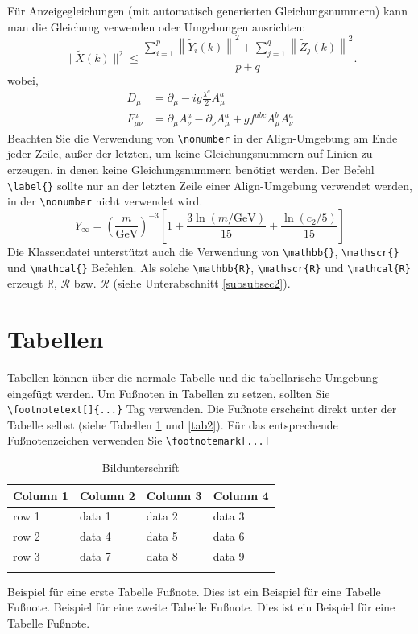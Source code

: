 \documentclass[pdflatex,sn-mathphys-num]{sn-jnl}%
\theoremstyle{thmstyleone}%
\theoremstyle{thmstyletwo}%
\theoremstyle{thmstylethree}%
\begin{document}
Für Anzeigegleichungen (mit automatisch generierten Gleichungsnummern) kann man die Gleichung verwenden oder Umgebungen ausrichten: \begin{equation}
\|\tilde{X}(k)\|^2 \leq\frac{\sum\limits_{i=1}^{p}\left\|\tilde{Y}_i(k)\right\|^2+\sum\limits_{j=1}^{q}\left\|\tilde{Z}_j(k)\right\|^2 }{p+q}.\label{eq1}
\end{equation} wobei, \begin{align}
D_\mu &=  \partial_\mu - ig \frac{\lambda^a}{2} A^a_\mu \nonumber \\
F^a_{\mu\nu} &= \partial_\mu A^a_\nu - \partial_\nu A^a_\mu + g f^{abc} A^b_\mu A^a_\nu \label{eq2}
\end{align} Beachten Sie die Verwendung von \verb+\nonumber+ in der Align-Umgebung am Ende jeder Zeile, außer der letzten, um keine Gleichungsnummern auf Linien zu erzeugen, in denen keine Gleichungsnummern benötigt werden. Der Befehl \verb+\label{}+ sollte nur an der letzten Zeile einer Align-Umgebung verwendet werden, in der \verb+\nonumber+ nicht verwendet wird. \begin{equation}
Y_\infty = \left( \frac{m}{\textrm{GeV}} \right)^{-3}
    \left[ 1 + \frac{3 \ln(m/\textrm{GeV})}{15}
    + \frac{\ln(c_2/5)}{15} \right]
\end{equation} Die Klassendatei unterstützt auch die Verwendung von \verb+\mathbb{}+, \verb+\mathscr{}+ und \verb+\mathcal{}+ Befehlen. Als solche \verb+\mathbb{R}+, \verb+\mathscr{R}+ und \verb+\mathcal{R}+ erzeugt $\mathbb{R}$, $\mathscr{R}$ bzw. $\mathcal{R}$ (siehe Unterabschnitt \ref{subsubsec2}).

\section{Tabellen}\label{sec5}

Tabellen können über die normale Tabelle und die tabellarische Umgebung eingefügt werden. Um Fußnoten in Tabellen zu setzen, sollten Sie \verb+\footnotetext[]{...}+ Tag verwenden. Die Fußnote erscheint direkt unter der Tabelle selbst (siehe Tabellen \ref{tab1} und \ref{tab2}). Für das entsprechende Fußnotenzeichen verwenden Sie \verb+\footnotemark[...]+

\begin{table}[h]
\caption{Bildunterschrift}\label{tab1}%
\begin{tabular}{@{}llll@{}}
\toprule
Column 1 & Column 2  & Column 3 & Column 4\\
\midrule
row 1    & data 1   & data 2  & data 3  \\
row 2    & data 4   & data 5\footnotemark[1]  & data 6  \\
row 3    & data 7   & data 8  & data 9\footnotemark[2]  \\
\botrule
\end{tabular}
 {\footnotetext[1]Beispiel für eine erste Tabelle Fußnote. Dies ist ein Beispiel für eine Tabelle Fußnote}. {\footnotetext[2]Beispiel für eine zweite Tabelle Fußnote. Dies ist ein Beispiel für eine Tabelle Fußnote}.
\end{table}
\end{document}
